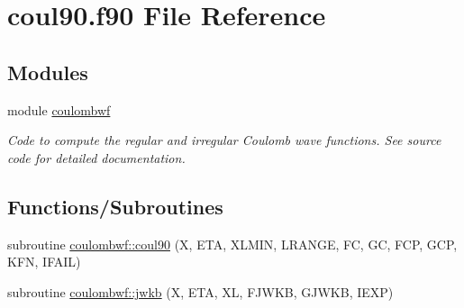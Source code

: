 \hypertarget{coul90_8f90}{}\section{coul90.\+f90 File Reference}
\label{coul90_8f90}
\subsection*{Modules}
\begin{DoxyCompactItemize}
\item 
module \hyperlink{namespacecoulombwf}{coulombwf}
\begin{DoxyCompactList}\small\item\em Code to compute the regular and irregular Coulomb wave functions. See source code for detailed documentation. \end{DoxyCompactList}\end{DoxyCompactItemize}
\subsection*{Functions/\+Subroutines}
\begin{DoxyCompactItemize}
\item 
subroutine \hyperlink{namespacecoulombwf_acb318117b6a1f36c6bf65b196f8ea77a}{coulombwf\+::coul90} (X, E\+TA, X\+L\+M\+IN, L\+R\+A\+N\+GE, FC, GC, F\+CP, G\+CP, K\+FN, I\+F\+A\+IL)
\item 
subroutine \hyperlink{namespacecoulombwf_ae2567eabc2798a95c720b07a68e61bba}{coulombwf\+::jwkb} (X, E\+TA, XL, F\+J\+W\+KB, G\+J\+W\+KB, I\+E\+XP)
\end{DoxyCompactItemize}
